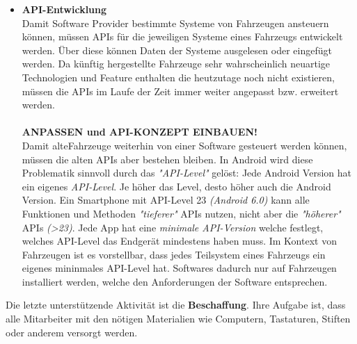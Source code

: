\begin{itemize}
	\item[] \hspace{-0.6cm} \textbf{API-Entwicklung}\\
	Damit Software Provider bestimmte Systeme von Fahrzeugen ansteuern können, müssen APIs für die jeweiligen Systeme eines Fahrzeugs entwickelt werden. Über diese können Daten der Systeme ausgelesen oder eingefügt werden. Da künftig hergestellte Fahrzeuge sehr wahrscheinlich neuartige Technologien und Feature enthalten die heutzutage noch nicht existieren, müssen die APIs im Laufe der Zeit immer weiter angepasst bzw. erweitert werden.\\\\
	\textbf{ANPASSEN und API-KONZEPT EINBAUEN!}\\
	Damit \glqq alte\grqq Fahrzeuge weiterhin von einer Software gesteuert werden können, müssen die alten APIs aber bestehen bleiben. In Android wird diese Problematik sinnvoll durch das \textit{"API-Level"} gelöst: Jede Android Version hat ein eigenes \textit{API-Level}. Je höher das Level, desto höher auch die Android Version. Ein Smartphone mit API-Level 23 \textit{(Android 6.0)} kann alle Funktionen und Methoden \textit{"tieferer"} APIs nutzen, nicht aber die \textit{"höherer"} APIs \textit{(>23)}. Jede App hat eine \textit{minimale API-Version} welche festlegt, welches API-Level das Endgerät mindestens haben muss. Im Kontext von Fahrzeugen ist es vorstellbar, dass jedes Teilsystem eines Fahrzeugs ein eigenes mininmales API-Level hat. Softwares dadurch nur auf Fahrzeugen installiert werden, welche den Anforderungen der Software entsprechen. 
\end{itemize}

Die letzte unterstützende Aktivität ist die \textbf{Beschaffung}. Ihre Aufgabe ist, dass alle Mitarbeiter mit den nötigen Materialien wie Computern, Tastaturen, Stiften oder anderem versorgt werden.\\\\